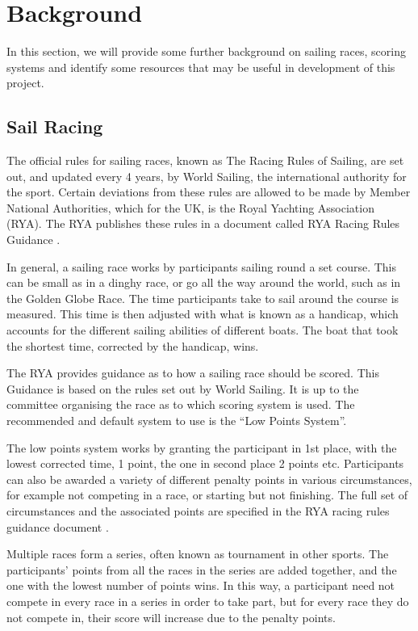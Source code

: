 \documentclass{l4proj}
\begin{document}
\chapter{Background}\label{chap:Back}
In this section, we will provide some further background on sailing races, scoring systems and identify some resources that may be useful in development of this project. 

\section{Sail Racing}
The official rules for sailing races, known as The Racing Rules of Sailing, are set out, and updated every 4 years, by World Sailing, the international authority for the sport. Certain deviations from these rules are allowed to be made by Member National Authorities, which for the UK, is the Royal Yachting Association (RYA). The RYA publishes these rules in a document called RYA Racing Rules Guidance \citep{RYAscore}.

In general, a sailing race works by participants sailing round a set course. This can be small as in a dinghy race, or go all the way around the world, such as in the Golden Globe Race. The time participants take to sail around the course is measured. This time is then adjusted with what is known as a handicap, which accounts for the different sailing abilities of different boats. The boat that took the shortest time, corrected by the handicap, wins.

The RYA provides guidance as to how a sailing race should be scored. This Guidance is based on the rules set out by World Sailing. It is up to the committee organising the race as to which scoring system is used. The recommended and default system to use is the “Low Points System”.

The low points system works by granting the participant in 1st place, with the lowest corrected time, 1 point, the one in second place 2 points etc. Participants can also be awarded a variety of different penalty points in various circumstances, for example not competing in a race, or starting but not finishing. The full set of circumstances and the associated points are specified in the RYA racing rules guidance document \citet{RYAscore}.

Multiple races form a series, often known as tournament in other sports. The participants' points from all the races in the series are added together, and the one with the lowest number of points wins. In this way, a participant need not compete in every race in a series in order to take part, but for every race they do not compete in, their score will increase due to the penalty points.
\end{document}
